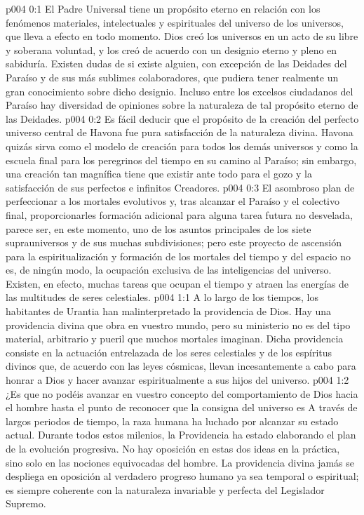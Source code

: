 \author{Consejero divino}
\vs p004 0:1 El Padre Universal tiene un propósito eterno en relación con los fenómenos materiales, intelectuales y espirituales del universo de los universos, que lleva a efecto en todo momento. Dios creó los universos en un acto de su libre y soberana voluntad, y los creó de acuerdo con un designio eterno y pleno en sabiduría. Existen dudas de si existe alguien, con excepción de las Deidades del Paraíso y de sus más sublimes colaboradores, que pudiera tener realmente un gran conocimiento sobre dicho designio. Incluso entre los excelsos ciudadanos del Paraíso hay diversidad de opiniones sobre la naturaleza de tal propósito eterno de las Deidades.
\vs p004 0:2 Es fácil deducir que el propósito de la creación del perfecto universo central de Havona fue pura satisfacción de la naturaleza divina. Havona quizás sirva como el modelo de creación para todos los demás universos y como la escuela final para los peregrinos del tiempo en su camino al Paraíso; sin embargo, una creación tan magnífica tiene que existir ante todo para el gozo y la satisfacción de sus perfectos e infinitos Creadores.
\vs p004 0:3 El asombroso plan de perfeccionar a los mortales evolutivos y, tras alcanzar el Paraíso y el colectivo final, proporcionarles formación adicional para alguna tarea futura no desvelada, parece ser, en este momento, uno de los asuntos principales de los siete suprauniversos y de sus muchas subdivisiones; pero este proyecto de ascensión para la espiritualización y formación de los mortales del tiempo y del espacio no es, de ningún modo, la ocupación exclusiva de las inteligencias del universo. Existen, en efecto, muchas tareas que ocupan el tiempo y atraen las energías de las multitudes de seres celestiales.
\vs p004 1:1 A lo largo de los tiempos, los habitantes de Urantia han malinterpretado la providencia de Dios. Hay una providencia divina que obra en vuestro mundo, pero su ministerio no es del tipo material, arbitrario y pueril que muchos mortales imaginan. Dicha providencia consiste en la actuación entrelazada de los seres celestiales y de los espíritus divinos que, de acuerdo con las leyes cósmicas, llevan incesantemente a cabo para honrar a Dios y hacer avanzar espiritualmente a sus hijos del universo.
\vs p004 1:2 ¿Es que no podéis avanzar en vuestro concepto del comportamiento de Dios hacia el hombre hasta el punto de reconocer que la consigna del universo es  A través de largos periodos de tiempo, la raza humana ha luchado por alcanzar su estado actual. Durante todos estos milenios, la Providencia ha estado elaborando el plan de la evolución progresiva. No hay oposición en estas dos ideas en la práctica, sino solo en las nociones equivocadas del hombre. La providencia divina jamás se despliega en oposición al verdadero progreso humano ya sea temporal o espiritual; es siempre coherente con la naturaleza invariable y perfecta del Legislador Supremo.
